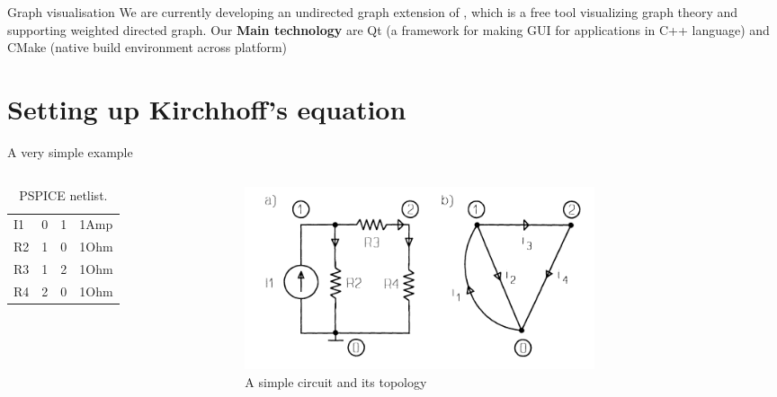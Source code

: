\documentclass[xcolor=dvipsnames]{beamer}
\begin{document}
\begin{frame}{Graph visualisation}
We are currently developing an undirected graph extension of 
\href{https://github.com/leannejdong/simple-graph-tool}{}, which 
is a free tool visualizing graph theory and supporting weighted directed graph. Our \textbf{Main technology}
are Qt (a framework for making GUI for applications in C++ language) and CMake (native build environment across platform)
	
\end{frame}

\section{Setting up Kirchhoff's equation}

\begin{frame}{A very simple example}
    \begin{columns}
        \begin{column}{.45\textwidth}
            \begin{table}[h!]
	    	\caption{PSPICE netlist.}
	    	\label{tab:netlist}
	   		 \begin{tabular}{l|l|l|l} %
	      		\hline
	      		I1 & 0 & 1 & 1Amp\\
	      		R2 & 1 & 0 & 1Ohm\\
	      		R3 & 1 & 2 & 1Ohm\\
	      		R4 & 2 & 0 & 1Ohm
	    	\end{tabular}
			\end{table}
        \end{column}
		\begin{column}{.75\textwidth}
         \begin{figure}[!ht]
  			\centering
    		\includegraphics[width=0.7\textwidth]{circuitt.png}
   			 \caption[figure 4]{A simple circuit and its topology}
    		\label{fig:eg4}
    	 \end{figure}
      	\end{column}
    \end{columns}
\end{frame}
\end{document}
